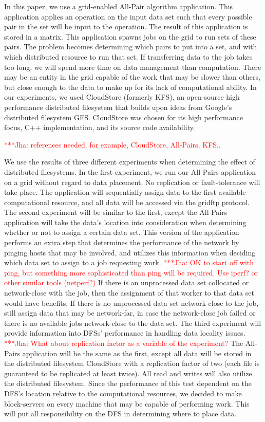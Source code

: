 \documentclass[a4paper,11pt]{article}
\newcommand{\jhanote}[1]{ {\textcolor{red} { ***Jha: #1 }}}
\newcommand{\jhanote}[1]{}
\begin{document}
In this paper, we use a grid-enabled All-Pair algorithm application. This application applies an operation on the input data set such that every possible pair in the set will be input to the operation. The result of this application is stored in a matrix. This application spawns jobs on the grid to run sets of these pairs. The problem becomes determining which pairs to put into a set, and with which distributed resource to run that set. If transferring data to the job takes too long, we will spend more time on data management than computation. There may be an entity in the grid capable of the work that may be slower than others, but close enough to the data to make up for its lack of computational ability. In our experiments, we used CloudStore (formerly KFS), an open-source high performance distributed filesystem that builds upon ideas from Google's distributed filesystem GFS. CloudStore was chosen for its high performance focus, C++ implementation, and its source code availability.

\jhanote{references needed. for example, CloudStore, All-Pairs, KFS.. }

We use the results of three different experiments when determining the effect of distributed filesystems. In the first experiment, we run our All-Pairs application on a grid without regard to data placement. No replication or fault-tolerance will take place. The application will sequentially assign data to the first available computational resource, and all data will be accessed via the gridftp protocol. The second experiment will be similar to the first, except the All-Pairs application will take the data's location into consideration when determining whether or not to assign a certain data set. This version of the application performs an extra step that determines the performance of the network by pinging hosts that may be involved, and utilizes this information when deciding which data set to assign to a job requesting work. \jhanote{OK to start off with ping, but something more sophisticated than ping will be required. Use iperf? or other similar tools (netperf?)} If there is an unprocessed data set collocated or network-close with the job, then the assignment of that worker to that data set would have benefits. If there is no unprocessed data set network-close to the job, still assign data that may be network-far, in case the network-close job failed or there is no available jobs network-close to the data set. The third experiment will provide information into DFSs' performance in handling data locality issues. \jhanote{What about replication factor as a variable of the experiment?} The All-Pairs application will be the same as the first, except all data will be stored in the distributed filesystem CloudStore with a replication factor of two (each file is guaranteed to be replicated at least twice). All read and writes will also utilize the distributed filesystem. Since the performance of this test dependent on the DFS's location relative to the computational resources, we decided to make block-servers on every machine that may be capable of performing work. This will put all responsibility on the DFS in determining where to place data.
\end{document}
